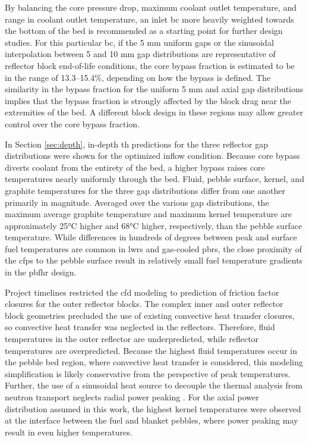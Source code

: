 By balancing the core pressure drop, maximum coolant outlet temperature, and range in coolant outlet temperature, an inlet \gls{bc} more heavily weighted towards the bottom of the bed is recommended as a starting point for further design studies. For this particular \gls{bc}, if the 5 \si{\milli\meter} uniform gaps or the sinusoidal interpolation between 5 and 10 \si{\milli\meter} gap distributions are representative of reflector block end-of-life conditions, the core bypass fraction is estimated to be in the range of 13.3--15.4\%, depending on how the bypass is defined. The similarity in the bypass fraction for the uniform 5 \si{\milli\meter} and axial gap distributions implies that the bypass fraction is strongly affected by the block drag near the extremities of the bed. A different block design in these regions may allow greater control over the core bypass fraction.

In Section \ref{sec:depth}, in-depth \gls{th} predictions for the three reflector gap distributions were shown for the optimized inflow condition. Because core bypass diverts coolant from the entirety of the bed, a higher bypass raises core temperatures nearly uniformly through the bed. Fluid, pebble surface, kernel, and graphite temperatures for the three gap distributions differ from one another primarily in magnitude. Averaged over the various gap distributions, the maximum average graphite temperature and maximum kernel temperature are approximately 25\si{\celsius} higher and 68\si{\celsius} higher, respectively, than the pebble surface temperature. While differences in hundreds of degrees between peak and surface fuel temperatures are common in \glspl{lwr} and gas-cooled \glspl{pbr}, the close proximity of the \glspl{cfp} to the pebble surface result in relatively small fuel temperature gradients in the \gls{pbfhr} design. 

Project timelines restricted the \gls{cfd} modeling to prediction of friction factor closures for the outer reflector blocks. The complex inner and outer reflector block geometries precluded the use of existing convective heat transfer closures, so convective heat transfer was neglected in the reflectors. Therefore, fluid temperatures in the outer reflector are underpredicted, while reflector temperatures are overpredicted. Because the highest fluid temperatures occur in the pebble bed region, where convective heat transfer is considered, this modeling simplification is likely conservative from the perspective of peak temperatures. Further, the use of a sinusoidal heat source to decouple the thermal analysis from neutron transport neglects radial power peaking \cite{xin_wang_thesis}. For the axial power distribution assumed in this work, the highest kernel temperatures were observed at the interface between the fuel and blanket pebbles, where power peaking may result in even higher temperatures.

